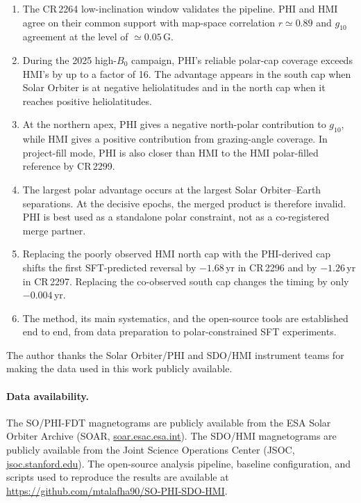 \documentclass{aa}
\begin{document}
\begin{enumerate}
    \item The CR\,2264 low-inclination window validates the pipeline. PHI and HMI agree on their common support with map-space correlation $r\simeq0.89$ and $g_{10}$ agreement at the level of $\simeq0.05$\,G.
    \item During the 2025 high-$B_0$ campaign, PHI's reliable polar-cap coverage exceeds HMI's by up to a factor of 16. The advantage appears in the south cap when Solar Orbiter is at negative heliolatitudes and in the north cap when it reaches positive heliolatitudes.
    \item At the northern apex, PHI gives a negative north-polar contribution to $g_{10}$, while HMI gives a positive contribution from grazing-angle coverage. In project-fill mode, PHI is also closer than HMI to the HMI polar-filled reference by CR\,2299.
    \item The largest polar advantage occurs at the largest Solar Orbiter--Earth separations. At the decisive epochs, the merged product is therefore invalid. PHI is best used as a standalone polar constraint, not as a co-registered merge partner.
    \item Replacing the poorly observed HMI north cap with the PHI-derived cap shifts the first SFT-predicted reversal by $-1.68$\,yr in CR\,2296 and by $-1.26$\,yr in CR\,2297. Replacing the co-observed south cap changes the timing by only $-0.004$\,yr.
    \item The method, its main systematics, and the open-source tools are established end to end, from data preparation to polar-constrained SFT experiments.
\end{enumerate}

\begin{acknowledgements}
The author thanks the Solar Orbiter/PHI and SDO/HMI instrument teams for making the data used in this work publicly available.
\end{acknowledgements}

\paragraph{Data availability.}
The SO/PHI-FDT magnetograms are publicly available from the ESA Solar Orbiter Archive (SOAR, \url{soar.esac.esa.int}). The SDO/HMI magnetograms are publicly available from the Joint Science Operations Center (JSOC, \url{jsoc.stanford.edu}). The open-source analysis pipeline, baseline configuration, and scripts used to reproduce the results are available at \url{https://github.com/mtalafha90/SO-PHI-SDO-HMI}.



\end{document}

